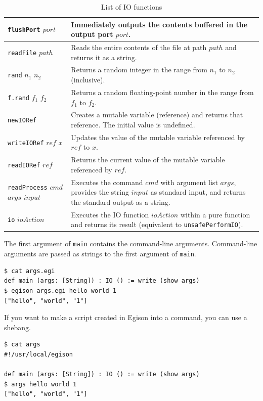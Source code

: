 \begin{table}[h]
\begin{center}
\begin{tabular}{ | l | p{9.5cm} |}
    \texttt{flushPort} $port$ & Immediately outputs the contents buffered in the output port $port$. \\ \hline
    \texttt{readFile} $path$ & Reads the entire contents of the file at path $path$ and returns it as a string. \\ \hline
    \texttt{rand} $n_1$ $n_2$ & Returns a random integer in the range from $n_1$ to $n_2$ (inclusive). \\ \hline
    \texttt{f.rand} $f_1$ $f_2$ & Returns a random floating-point number in the range from $f_1$ to $f_2$. \\ \hline
    \texttt{newIORef} & Creates a mutable variable (reference) and returns that reference. The initial value is undefined. \\ \hline
    \texttt{writeIORef} $ref$ $x$ & Updates the value of the mutable variable referenced by $ref$ to $x$. \\ \hline
    \texttt{readIORef} $ref$ & Returns the current value of the mutable variable referenced by $ref$. \\ \hline
    \texttt{readProcess} $cmd$ $args$ $input$ & Executes the command $cmd$ with argument list $args$, provides the string $input$ as standard input, and returns the standard output as a string. \\ \hline
    \texttt{io} $ioAction$ & Executes the IO function $ioAction$ within a pure function and returns its result (equivalent to \texttt{unsafePerformIO}). \\ \hline
    \end{tabular}
\end{center}
    \caption{List of IO functions}
    \label{tab:ioFunctions}
\end{table}

The first argument of \lstinline{main} contains the command-line arguments.
Command-line arguments are passed as strings to the first argument of \lstinline{main}.
\begin{lstlisting}[language=egison,numbers=none]
$ cat args.egi
def main (args: [String]) : IO () := write (show args)
$ egison args.egi hello world 1
["hello", "world", "1"]
\end{lstlisting}

If you want to make a script created in Egison into a command, you can use a shebang.
\begin{lstlisting}[language=egison,numbers=none]
$ cat args
#!/usr/local/egison

def main (args: [String]) : IO () := write (show args)
$ args hello world 1
["hello", "world", "1"]
\end{lstlisting}

